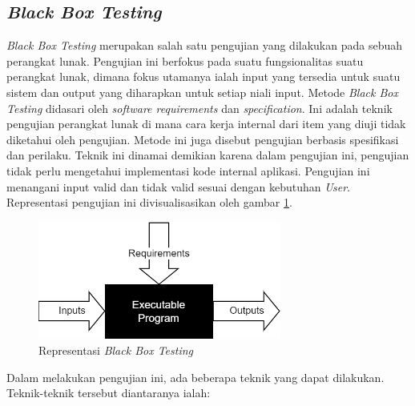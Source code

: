 \subsection{\textit{Black Box Testing}}
\textit{Black Box Testing} merupakan salah satu pengujian yang dilakukan pada sebuah perangkat lunak.
Pengujian ini berfokus pada suatu fungsionalitas suatu perangkat lunak, dimana fokus utamanya ialah input yang tersedia untuk suatu sistem dan output yang diharapkan untuk setiap niali input.
Metode \textit{Black Box Testing} didasari oleh \textit{software requirements} dan \textit{specification}. Ini adalah teknik pengujian perangkat lunak di mana cara kerja internal dari item yang diuji tidak diketahui oleh pengujian.
Metode ini juga disebut pengujian berbasis spesifikasi dan perilaku. 
Teknik ini dinamai demikian karena dalam pengujian ini, pengujian tidak perlu mengetahui implementasi kode internal aplikasi.
Pengujian ini menangani input valid dan tidak valid sesuai dengan kebutuhan \textit{User}. Representasi pengujian ini divisualisasikan oleh gambar \ref*{Fig:Black Box Testing}.
\begin{figure}[H]
	\centering
	\includegraphics[width=8cm]{contents/chapter-2/images/BlackBox-Testing.png}
	\caption{Representasi \textit{Black Box Testing}}
	\label{Fig:Black Box Testing}
\end{figure}
Dalam melakukan pengujian ini, ada beberapa teknik yang dapat dilakukan. Teknik-teknik tersebut diantaranya ialah:
